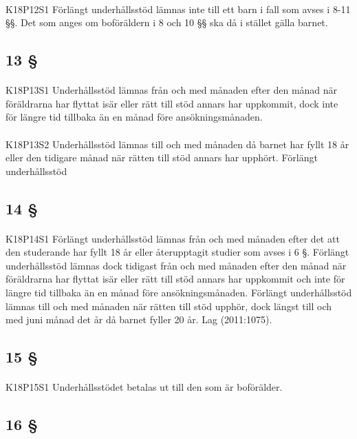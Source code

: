 \documentclass[a4paper,notitlepage,openany,10pt]{book}
\begin{document}
\paragraph*{}
{\tiny K18P12S1}
Förlängt underhållsstöd lämnas inte till ett barn i fall som avses i 8-11 §§. Det som anges om boföräldern i 8 och 10 §§ ska då i stället gälla barnet.
\subsection*{13 §}
\paragraph*{}
{\tiny K18P13S1}
Underhållsstöd lämnas från och med månaden efter den månad när föräldrarna har flyttat isär eller rätt till stöd annars har uppkommit, dock inte för längre tid tillbaka än en månad före ansökningsmånaden.
\paragraph*{}
{\tiny K18P13S2}
Underhållsstöd lämnas till och med månaden då barnet har fyllt 18 år eller den tidigare månad när rätten till stöd annars har upphört.
Förlängt underhållsstöd
\subsection*{14 §}
\paragraph*{}
{\tiny K18P14S1}
Förlängt underhållsstöd lämnas från och med månaden efter det att den studerande har fyllt 18 år eller återupptagit studier som avses i 6 §. Förlängt underhållsstöd lämnas dock tidigast från och med månaden efter den månad när föräldrarna har flyttat isär eller rätt till stöd annars har uppkommit och inte för längre tid tillbaka än en månad före ansökningsmånaden.
Förlängt underhållsstöd lämnas till och med månaden när rätten till stöd upphör, dock längst till och med juni månad det år då barnet fyller 20 år.
Lag (2011:1075).
\subsection*{15 §}
\paragraph*{}
{\tiny K18P15S1}
Underhållsstödet betalas ut till den som är boförälder.
\subsection*{16 §}
\end{document}
